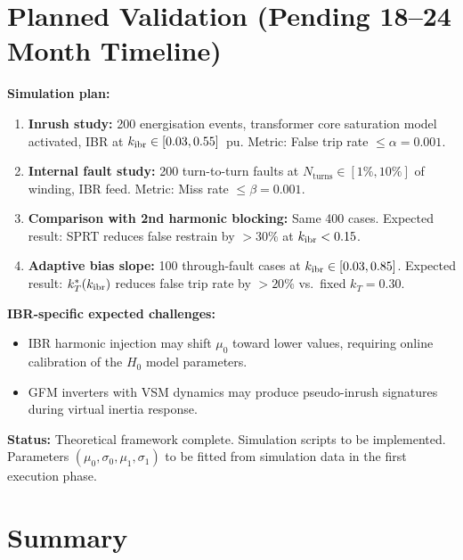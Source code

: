 \section{Planned Validation (Pending 18--24 Month Timeline)}
\label{sec:ch6_validation}

\begin{tcolorbox}[colback=orange!5,colframe=orange!60!black,
  fonttitle=\bfseries\small,
  title={C11 and C12 --- 87T-SPRT Validation (Pending)},
  breakable]
\small
\textbf{Simulation plan:}
\begin{enumerate}
\item \textbf{Inrush study:} 200 energisation events, transformer
      core saturation model activated, IBR at $k_\mathrm{ibr} \in [0.03, 0.55]$~pu.
      Metric: False trip rate $\leq \alpha = 0.001$.
\item \textbf{Internal fault study:} 200 turn-to-turn faults at
      $N_\mathrm{turns} \in [1\%, 10\%]$ of winding, IBR feed.
      Metric: Miss rate $\leq \beta = 0.001$.
\item \textbf{Comparison with 2nd harmonic blocking:} Same 400 cases.
      Expected result: SPRT reduces false restrain by $>30\%$
      at $k_\mathrm{ibr} < 0.15$.
\item \textbf{Adaptive bias slope:} 100 through-fault cases at
      $k_\mathrm{ibr} \in [0.03, 0.85]$.
      Expected result: $k_T^*(k_\mathrm{ibr})$ reduces false trip rate by $>20\%$
      vs.\ fixed $k_T = 0.30$.
\end{enumerate}

\textbf{IBR-specific expected challenges:}
\begin{itemize}
\item IBR harmonic injection may shift $\mu_0$ toward lower values,
      requiring online calibration of the $H_0$ model parameters.
\item GFM inverters with VSM dynamics may produce pseudo-inrush
      signatures during virtual inertia response.
\end{itemize}

\textbf{Status:} Theoretical framework complete. Simulation scripts to
be implemented. Parameters $(\mu_0, \sigma_0, \mu_1, \sigma_1)$ to be
fitted from simulation data in the first execution phase.
\end{tcolorbox}

\section{Summary}
\label{sec:ch6_summary}

